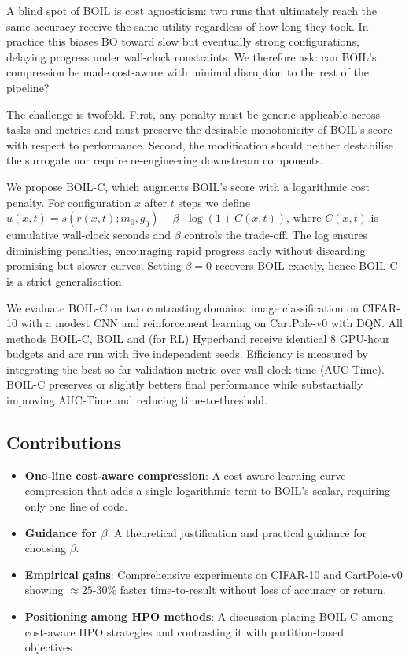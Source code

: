 \documentclass{article} %
\begin{document}
A blind spot of BOIL is cost agnosticism: two runs that ultimately reach the same accuracy receive the same utility regardless of how long they took. In practice this biases BO toward slow but eventually strong configurations, delaying progress under wall-clock constraints. We therefore ask: can BOIL's compression be made cost-aware with minimal disruption to the rest of the pipeline?

The challenge is twofold. First, any penalty must be generic applicable across tasks and metrics and must preserve the desirable monotonicity of BOIL's score with respect to performance. Second, the modification should neither destabilise the surrogate nor require re-engineering downstream components.

We propose BOIL-C, which augments BOIL's score with a logarithmic cost penalty. For configuration \(x\) after \(t\) steps we define
\(u(x,t)=s(r(x,t);m_0,g_0)-\beta\cdot\log(1+C(x,t))\),
where \(C(x,t)\) is cumulative wall-clock seconds and \(\beta\) controls the trade-off. The log ensures diminishing penalties, encouraging rapid progress early without discarding promising but slower curves. Setting \(\beta=0\) recovers BOIL exactly, hence BOIL-C is a strict generalisation.

We evaluate BOIL-C on two contrasting domains: image classification on CIFAR-10 with a modest CNN and reinforcement learning on CartPole-v0 with DQN\@. All methods BOIL-C, BOIL and (for RL) Hyperband receive identical 8 GPU-hour budgets and are run with five independent seeds. Efficiency is measured by integrating the best-so-far validation metric over wall-clock time (AUC-Time). BOIL-C preserves or slightly betters final performance while substantially improving AUC-Time and reducing time-to-threshold.

\subsection{Contributions}
\begin{itemize}
  \item \textbf{One-line cost-aware compression}: A cost-aware learning-curve compression that adds a single logarithmic term to BOIL's scalar, requiring only one line of code.
  \item \textbf{Guidance for \(\beta\)}: A theoretical justification and practical guidance for choosing \(\beta\).
  \item \textbf{Empirical gains}: Comprehensive experiments on CIFAR-10 and CartPole-v0 showing \(\approx 25\text{-}30\%\) faster time-to-result without loss of accuracy or return.
  \item \textbf{Positioning among HPO methods}: A discussion placing BOIL-C among cost-aware HPO strategies and contrasting it with partition-based objectives~\cite{mlodozeniec-2023-hyperparameter}.
\end{itemize}
\end{document}
